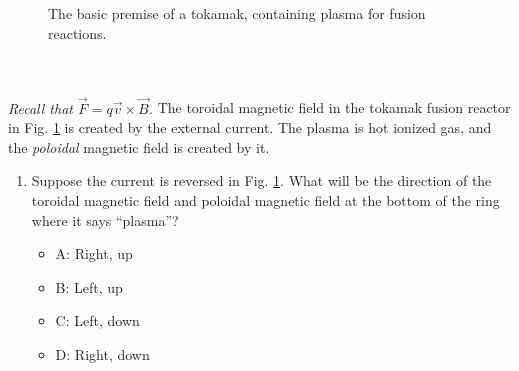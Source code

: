 \documentclass[10pt]{article}
\begin{document}
\begin{enumerate}
\begin{figure}
\caption{\label{fig:tok} The basic premise of a tokamak, containing plasma for fusion reactions.}
\end{figure}
\\ \\
\textit{Recall that $\vec{F} = q\vec{v} \times \vec{B}$.} The toroidal magnetic field in the tokamak fusion reactor in Fig. \ref{fig:tok} is created by the external current.  The plasma is hot ionized gas, and the \textit{poloidal} magnetic field is created by it.
\begin{enumerate}
\item Suppose the current is reversed in Fig. \ref{fig:tok}.  What will be the direction of the toroidal magnetic field and poloidal magnetic field at the bottom of the ring where it says ``plasma''?
\begin{itemize}
\item A: Right, up
\item B: Left, up
\item C: Left, down
\item D: Right, down
\end{itemize}
\end{enumerate}
\end{enumerate}
\end{document}
